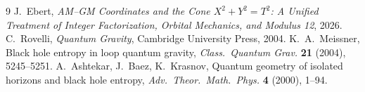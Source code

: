 \documentclass[11pt]{amsart}
\theoremstyle{remark}
\begin{document}
\begin{thebibliography}{9}
 J.~Ebert, \emph{AM--GM Coordinates and the Cone $X^2+Y^2=T^2$: A
Unified Treatment of Integer Factorization, Orbital Mechanics, and Modulus 12}, 2026.
 C.~Rovelli, \emph{Quantum Gravity}, Cambridge University Press, 2004.
 K.~A.~Meissner, Black hole entropy in loop quantum gravity,
\emph{Class.\ Quantum Grav.} \textbf{21} (2004), 5245--5251.
 A.~Ashtekar, J.~Baez, K.~Krasnov, Quantum geometry
of isolated horizons and black hole entropy, \emph{Adv.\ Theor.\ Math.\ Phys.}
\textbf{4} (2000), 1--94.
\end{thebibliography}
\end{document}
